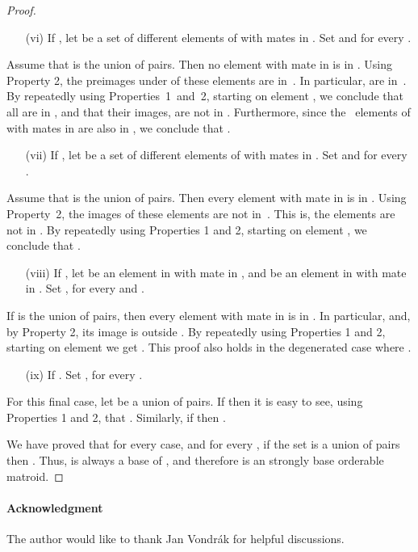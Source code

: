 \documentclass[letterpaper,11pt]{article}
\theoremstyle{definition}
\begin{document}
\begin{proof}
\begin{enumerate}
\item[(vi)] If , let  be a set of  different elements of  with mates in . Set  and  for every .
\end{enumerate}
Assume that  is the union of  pairs. Then no element with mate in  is in . Using Property 2, the preimages under  of these elements are in~. In particular,  are in~. By repeatedly using Properties~1~and~2, starting on element , we conclude that all  are in , and that their images,  are not in . Furthermore, since the ~elements of  with mates in  are also in , we conclude that .

\begin{enumerate}
\item[(vii)] If , let  be a set of  different elements of  with mates in . Set  and  for every .
\end{enumerate}
Assume that  is the union of  pairs. Then every element with mate in  is in . Using Property~2, the images of these elements are not in~. This is, the elements  are not in . By repeatedly using Properties 1 and 2, starting on element , we conclude that .
\begin{enumerate}
\item[(viii)] If , let  be an element in  with mate in , and  be an element in  with mate in . Set ,  for every  and .
\end{enumerate}
If  is the union of  pairs, then every element with mate in  is in . In particular,  and, by Property 2, its image  is outside . By repeatedly using Properties 1 and 2, starting on element  we get . This proof also holds in the degenerated case where .

\begin{enumerate}
  \item[(ix)] If . Set ,  for every .
\end{enumerate}
For this final case, let  be a union of  pairs. If  then it is easy to see, using Properties 1 and 2, that . Similarly, if  then .

We have proved that for every case, and for every , if the set  is a union of pairs then . Thus,  is always a base of , and therefore  is an strongly base orderable matroid. \qedhere
\end{proof}

\paragraph{Acknowledgment} The author would like to thank Jan Vondr\'ak for helpful discussions.



\end{document}
